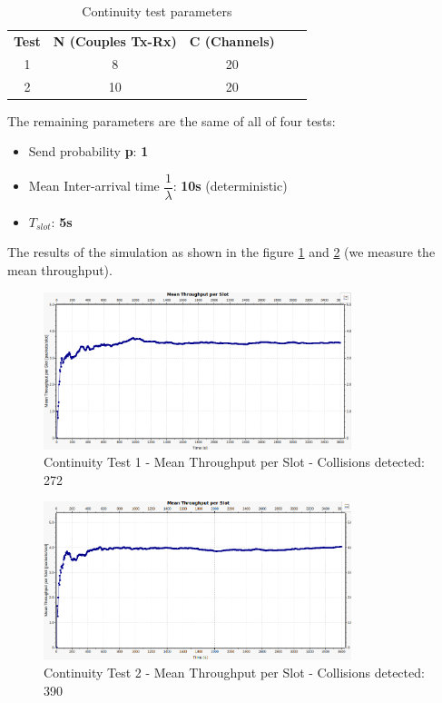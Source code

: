 \begin{table}[htpb]
	\centering
		\begin{tabular}{|c|c|c|ll}
			\cline{1-3}
			{\textbf{Test}} & { \textbf{N (Couples Tx-Rx)}} & { \textbf{C (Channels)}} &  &  \\ \cline{1-3}
			1 & 8  & 20 &  &  \\ \cline{1-3}
			2 & 10 & 20 &  &  \\ \cline{1-3}
		\end{tabular}
	\caption{Continuity test parameters}
	\label{tab: continuity test}
\end{table}

\noindent The remaining parameters are the same of all of four tests:
\begin{itemize}
	\item Send probability \textbf{p}: \textbf{1}
	\item Mean Inter-arrival time $\dfrac{1}{\lambda}$: \textbf{10s} (deterministic)
	\item $T_{slot}$: \textbf{5s}
\end{itemize}

\noindent The results of the simulation as shown in the figure \ref{img: continuityTest1a} and \ref{img: continuityTest1b} (we measure the mean throughput).

\begin{figure}[H]
	\centering
	\includegraphics[width=0.8\textwidth]{img/continuityTest1a.png}
	\caption{Continuity Test 1 - Mean Throughput per Slot - Collisions detected: 272}
	\label {img: continuityTest1a}
\end{figure}

\begin{figure}[H]
	\centering
	\includegraphics[width=0.8\textwidth]{img/continuityTest1b.png}
	\caption{Continuity Test 2 - Mean Throughput per Slot - Collisions detected: 390}
	\label {img: continuityTest1b}
\end{figure}

